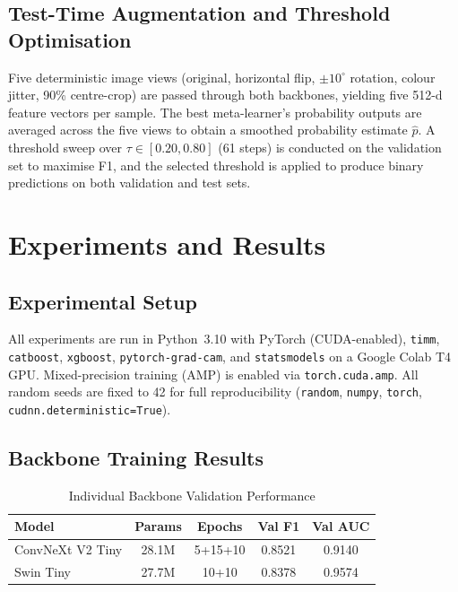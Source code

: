 \documentclass[conference]{IEEEtran}
\begin{document}
\subsection{Test-Time Augmentation and Threshold Optimisation}

Five deterministic image views (original, horizontal flip, $\pm10^{\circ}$
rotation, colour jitter, 90\% centre-crop) are passed through both backbones,
yielding five 512-d feature vectors per sample.  The best meta-learner's
probability outputs are averaged across the five views to obtain a smoothed
probability estimate $\hat{p}$.  A threshold sweep over $\tau \in [0.20, 0.80]$
(61 steps) is conducted on the validation set to maximise F1, and the selected
threshold is applied to produce binary predictions on both validation and test sets.

\section{Experiments and Results}
\label{sec:experiments}

\subsection{Experimental Setup}

All experiments are run in Python~3.10 with PyTorch (CUDA-enabled), \texttt{timm},
\texttt{catboost}, \texttt{xgboost}, \texttt{pytorch-grad-cam}, and
\texttt{statsmodels} on a Google Colab T4 GPU.  Mixed-precision training (AMP)
is enabled via \texttt{torch.cuda.amp}.  All random seeds are fixed to 42 for
full reproducibility (\texttt{random}, \texttt{numpy}, \texttt{torch},
\texttt{cudnn.deterministic=True}).

\subsection{Backbone Training Results}

\begin{table}[t]
  \caption{Individual Backbone Validation Performance}
  \label{tab:backbones}
  \centering
  \setlength{\tabcolsep}{4pt}
  \begin{tabular}{lcccc}
    \toprule
    \textbf{Model} & \textbf{Params} & \textbf{Epochs} & \textbf{Val F1} & \textbf{Val AUC} \\
    \midrule
    ConvNeXt V2 Tiny & 28.1M & 5+15+10 & 0.8521 & 0.9140 \\
    Swin Tiny        & 27.7M & 10+10   & 0.8378 & 0.9574 \\
    \bottomrule
  \end{tabular}
\end{table}
\end{document}
